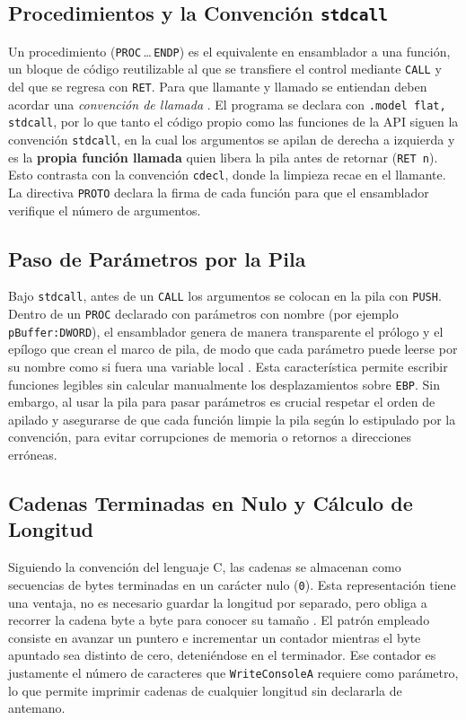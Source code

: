 \documentclass[a4paper,12pt]{article}
\begin{document}
\subsection{Procedimientos y la Convención \texttt{stdcall}}
Un procedimiento (\texttt{PROC}\,\dots\,\texttt{ENDP}) es el equivalente en ensamblador a una función, un bloque de código reutilizable al que se transfiere el control mediante \texttt{CALL} y del que se regresa con \texttt{RET}. Para que llamante y llamado se entiendan deben acordar una \textit{convención de llamada} \cite{irvine2011assembly}. El programa se declara con \texttt{.model flat, stdcall}, por lo que tanto el código propio como las funciones de la API siguen la convención \texttt{stdcall}, en la cual los argumentos se apilan de derecha a izquierda y es la \textbf{propia función llamada} quien libera la pila antes de retornar (\texttt{RET n}). Esto contrasta con la convención \texttt{cdecl}, donde la limpieza recae en el llamante. La directiva \texttt{PROTO} declara la firma de cada función para que el ensamblador verifique el número de argumentos.

\subsection{Paso de Parámetros por la Pila}
Bajo \texttt{stdcall}, antes de un \texttt{CALL} los argumentos se colocan en la pila con \texttt{PUSH}. Dentro de un \texttt{PROC} declarado con parámetros con nombre (por ejemplo \texttt{pBuffer:DWORD}), el ensamblador genera de manera transparente el prólogo y el epílogo que crean el marco de pila, de modo que cada parámetro puede leerse por su nombre como si fuera una variable local \cite{stallings2019computer}. Esta característica permite escribir funciones legibles sin calcular manualmente los desplazamientos sobre \texttt{EBP}. Sin embargo, al usar la pila para pasar parámetros es crucial respetar el orden de apilado y asegurarse de que cada función limpie la pila según lo estipulado por la convención, para evitar corrupciones de memoria o retornos a direcciones erróneas.

\subsection{Cadenas Terminadas en Nulo y Cálculo de Longitud}
Siguiendo la convención del lenguaje C, las cadenas se almacenan como secuencias de bytes terminadas en un carácter nulo (\texttt{0}). Esta representación tiene una ventaja, no es necesario guardar la longitud por separado, pero obliga a recorrer la cadena byte a byte para conocer su tamaño \cite{irvine2020assembly}. El patrón empleado consiste en avanzar un puntero e incrementar un contador mientras el byte apuntado sea distinto de cero, deteniéndose en el terminador. Ese contador es justamente el número de caracteres que \texttt{WriteConsoleA} requiere como parámetro, lo que permite imprimir cadenas de cualquier longitud sin declararla de antemano.
\end{document}
